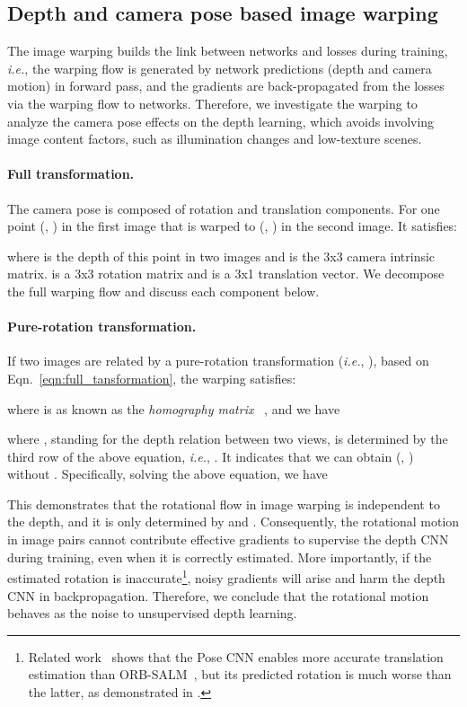 \documentclass{article}
\newcommand{\equref}[1]{Eqn.~\ref{#1}}
\def\ie{\emph{i.e.}}
\begin{document}
\subsection{Depth and camera pose based image warping}\label{sec:proof}
The image warping builds the link between networks and losses during training,
\ie, the warping flow is generated by network predictions (depth and camera motion) in forward pass,
and the gradients are back-propagated from the losses via the warping flow to networks.
Therefore, we investigate the warping to analyze the camera pose effects on the depth learning, 
which avoids involving image content factors, such as illumination changes and low-texture scenes.


\paragraph{Full transformation.}
The camera pose is composed of rotation and translation components.
For one point (, ) in the first image that is warped to (, ) in the second image.
It satisfies:

where  is the depth of this point in two images and  is the 3x3 camera intrinsic matrix.
 is a 3x3 rotation matrix and  is a 3x1 translation vector.
We decompose the full warping flow and discuss each component below.
 
\paragraph{Pure-rotation transformation.}
If two images are related by a pure-rotation transformation (\ie, ),
based on \equref{eqn:full_tansformation},
the warping satisfies:

where  is as known as the \emph{homography matrix} ~\cite{hartley2003multiple},
and we have


where , standing for the depth relation between two views, is determined by the third row of the above equation,
\ie, .
It indicates that we can obtain (, ) without .
Specifically, solving the above equation, we have



This demonstrates that the rotational flow in image warping is independent to the depth,
and it is only determined by  and .
Consequently, the rotational motion in image pairs cannot contribute effective gradients to supervise the depth CNN during training,
even when it is correctly estimated.
More importantly, if the estimated rotation is inaccurate\footnote{Related work~\cite{zhou2017unsupervised,yin2018geonet,ranjan2019cc,monodepth2, bian2019depth} shows that the Pose CNN enables more accurate translation estimation than ORB-SALM~\cite{mur2015orb}, but its predicted rotation is much worse than the latter, as demonstrated in \cite{bian2019depth,zhan2019dfvo}.}, noisy gradients will arise and harm the depth CNN in backpropagation.
Therefore, we conclude that the rotational motion behaves as the noise to unsupervised depth learning.
\end{document}
